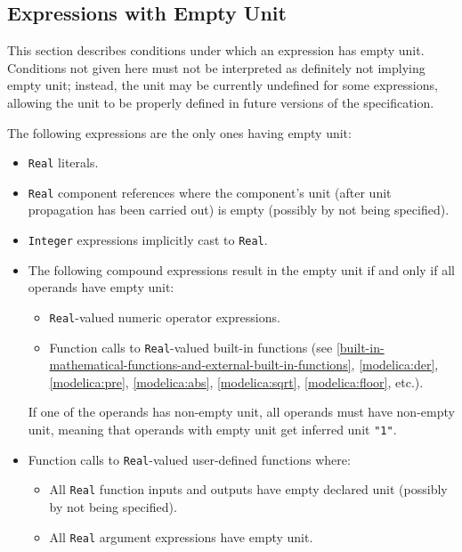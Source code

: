 \subsection{Expressions with Empty Unit}\label{expressions-with-empty-unit}

This section describes conditions under which an expression has empty unit.
Conditions not given here must not be interpreted as definitely not implying empty unit; instead, the unit may be currently undefined for some expressions, allowing the unit to be properly defined in future versions of the specification.

The following expressions are the only ones having empty unit:
\begin{itemize}
\item
  \lstinline!Real! literals.
\item
  \lstinline!Real! component references where the component's unit (after unit propagation has been carried out) is empty (possibly by not being specified).
\item
  \lstinline!Integer! expressions implicitly cast to \lstinline!Real!.
\item
  The following compound expressions result in the empty unit if and only if all operands have empty unit:
  \begin{itemize}
    \item \lstinline!Real!-valued numeric operator expressions.
    \item Function calls to \lstinline!Real!-valued built-in functions (see \cref{built-in-mathematical-functions-and-external-built-in-functions}, \cref{modelica:der}, \cref{modelica:pre}, \cref{modelica:abs}, \cref{modelica:sqrt}, \cref{modelica:floor}, etc.).
  \end{itemize}
  If one of the operands has non-empty unit, all operands must have non-empty unit, meaning that operands with empty unit get inferred unit \lstinline!"1"!.
\item
  Function calls to \lstinline!Real!-valued user-defined functions where:
  \begin{itemize}
    \item All \lstinline!Real! function inputs and outputs have empty declared unit (possibly by not being specified).
    \item All \lstinline!Real! argument expressions have empty unit.
  \end{itemize}
\end{itemize}

